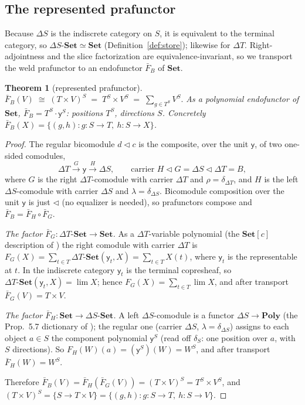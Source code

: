 \documentclass[11pt]{amsart}
\theoremstyle{plain}
\newtheorem{theorem}{Theorem}[section]
\theoremstyle{definition}
\newcommand{\Poly}{\mathbf{Poly}}
\newcommand{\Set}{\mathbf{Set}}
\renewcommand{\lhd}{\triangleleft}
\newcommand{\Store}[1]{\Delta #1}
\newcommand{\yon}{\mathsf{y}}
\begin{document}
\subsection*{The represented prafunctor}
Because $\Store{S}$ is the indiscrete category on $S$, it is equivalent to the terminal
category, so $\Store{S}\text{-}\Set\simeq\Set$ (Definition~\ref{def:store}); likewise for
$\Store{T}$. Right-adjointness and the slice factorization are equivalence-invariant, so we
transport the weld prafunctor to an endofunctor $\bar F_B$ of $\Set$.

\begin{theorem}[represented prafunctor]\label{thm:weld-pra}
$\displaystyle \bar F_B(V)\;\cong\;(T\times V)^{S}\;=\;T^{S}\times V^{S}
\;=\;\sum_{g\in T^{S}}V^{S}.$
As a polynomial endofunctor of $\Set$, $\bar F_B=T^{S}\cdot\yon^{S}$: positions $T^{S}$,
directions $S$. Concretely $\bar F_B(X)=\{(g,h):g\colon S\to T,\ h\colon S\to X\}$.
\end{theorem}

\begin{proof}
The regular bicomodule $d\lhd c$ is the composite, over the unit $\yon$, of two one-sided
comodules,
\[
\Store{T}\xrightarrow{\;G\;}\yon\xrightarrow{\;H\;}\Store{S},
\qquad\text{carrier } H\lhd G=\Store{S}\lhd\Store{T}=B,
\]
where $G$ is the right $\Store{T}$-comodule with carrier $\Store{T}$ and $\rho=\delta_{\Store{T}}$,
and $H$ is the left $\Store{S}$-comodule with carrier $\Store{S}$ and
$\lambda=\delta_{\Store{S}}$. Bicomodule composition over the unit $\yon$ is just $\lhd$
(no equalizer is needed), so prafunctors compose and $\bar F_B=\bar F_H\circ\bar F_G$.

\emph{The factor $\bar F_G\colon\Store{T}\text{-}\Set\to\Set$.} As a $\Store{T}$-variable
polynomial (the $\Set[c]$ description of \cite[Prop.~3.9]{SGF}) the right comodule with
carrier $\Store{T}$ is $F_G(X)=\sum_{t\in T}\Store{T}\text{-}\Set(\yon_t,X)=\sum_{t\in
T}X(t)$, where $\yon_t$ is the representable at $t$. In the indiscrete category $\yon_t$ is
the terminal copresheaf, so $\Store{T}\text{-}\Set(\yon_t,X)=\lim X$; hence
$F_G(X)=\sum_{t\in T}\lim X$, and after transport $\bar F_G(V)=T\times V$.

\emph{The factor $\bar F_H\colon\Set\to\Store{S}\text{-}\Set$.} A left $\Store{S}$-comodule
is a functor $\Store{S}\to\Poly$ (the Prop.~5.7 dictionary of \cite{SGF}); the regular one
(carrier $\Store{S}$, $\lambda=\delta_{\Store{S}}$) assigns to each object $a\in S$ the
component polynomial $\yon^{S}$ (read off $\delta_S$: one position over $a$, with $S$
directions). So $F_H(W)(a)=(\yon^{S})(W)=W^{S}$, and after transport $\bar F_H(W)=W^{S}$.

Therefore $\bar F_B(V)=\bar F_H(\bar F_G(V))=(T\times V)^{S}=T^{S}\times V^{S}$, and
$(T\times V)^{S}=\{S\to T\times V\}=\{(g,h):g\colon S\to T,\ h\colon S\to V\}$.
\end{proof}
\end{document}
